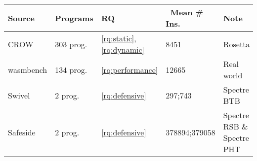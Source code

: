 
\begin{table}
\renewcommand\arraystretch{1.1}
\begin{adjustbox}{width=\linewidth,totalheight=\textheight, keepaspectratio}
{
\color{blue}
    \begin{tabular}{p{1.5cm} | l | p{1cm} | l| p{2cm}  }
        \hline
        Source & Programs & RQ & \ Mean \# Ins. & Note  \\
        \hline \hline
        
        CROW \cite{arteaga2020crow} & 303 prog. & \ref{rq:static}, \ref{rq:dynamic} &  8451 & Rosetta  \\
        \hline

        wasmbench \cite{hilbig2021empirical} & 134 prog. & \ref{rq:performance} & 12665 & Real world \\
        
        \hline

        Swivel \cite{Swivel} & 2 prog. & \ref{rq:defensive} & 297;743 & Spectre BTB  \\
        \hline
        Safeside \cite{Swivel, safeside}  & 2 prog. & \ref{rq:defensive} & 378894;379058 & Spectre RSB \& Spectre PHT  \\

        

    \end{tabular}
}
\end{adjustbox}
    
    \caption{ }
    \label{tab:corpus}
\end{table}



    
